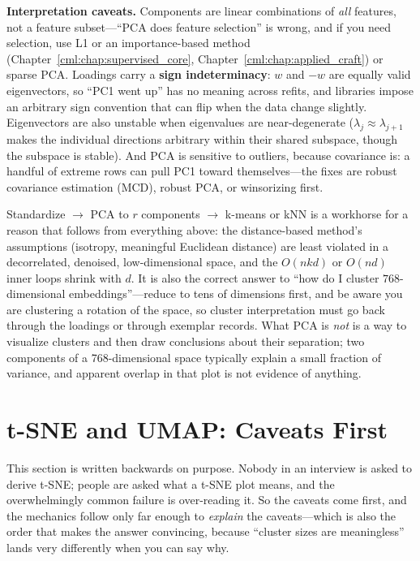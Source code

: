 \textbf{Interpretation caveats.} Components are linear combinations of \emph{all} features, not a feature subset---``PCA does feature selection'' is wrong, and if you need selection, use L1 or an importance-based method (Chapter~\ref{cml:chap:supervised_core}, Chapter~\ref{cml:chap:applied_craft}) or sparse PCA. Loadings carry a \textbf{sign indeterminacy}: $w$ and $-w$ are equally valid eigenvectors, so ``PC1 went up'' has no meaning across refits, and libraries impose an arbitrary sign convention that can flip when the data change slightly. Eigenvectors are also unstable when eigenvalues are near-degenerate ($\lambda_j \approx \lambda_{j+1}$ makes the individual directions arbitrary within their shared subspace, though the subspace is stable). And PCA is sensitive to outliers, because covariance is: a handful of extreme rows can pull PC1 toward themselves---the fixes are robust covariance estimation (MCD), robust PCA, or winsorizing first.

\begin{keyinsight}
Standardize $\to$ PCA to $r$ components $\to$ k-means or kNN is a workhorse for a reason that follows from everything above: the distance-based method's assumptions (isotropy, meaningful Euclidean distance) are least violated in a decorrelated, denoised, low-dimensional space, and the $O(nkd)$ or $O(nd)$ inner loops shrink with $d$. It is also the correct answer to ``how do I cluster $768$-dimensional embeddings''---reduce to tens of dimensions first, and be aware you are clustering a rotation of the space, so cluster interpretation must go back through the loadings or through exemplar records. What PCA is \emph{not} is a way to visualize clusters and then draw conclusions about their separation; two components of a 768-dimensional space typically explain a small fraction of variance, and apparent overlap in that plot is not evidence of anything.
\end{keyinsight}

\section{t-SNE and UMAP: Caveats First}
\label{cml:sec:manifold}

This section is written backwards on purpose. Nobody in an interview is asked to derive t-SNE; people are asked what a t-SNE plot means, and the overwhelmingly common failure is over-reading it. So the caveats come first, and the mechanics follow only far enough to \emph{explain} the caveats---which is also the order that makes the answer convincing, because ``cluster sizes are meaningless'' lands very differently when you can say why.

